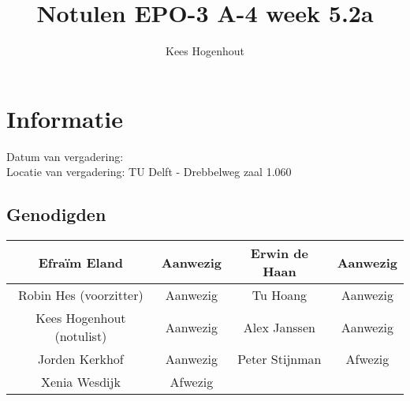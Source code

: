 \documentclass{article}
\begin{document}
\title{Notulen EPO-3 A-4 week 5.2a }%
\author{Kees Hogenhout}%
\maketitle

\section*{Informatie}
Datum van vergadering: \\ %
Locatie van vergadering: TU Delft - Drebbelweg zaal 1.060 %
\subsection*{Genodigden}
\begin{center}
\begin{tabular}{|c |c | c| c|}
	\hline
Efraïm Eland  & Aanwezig & Erwin de Haan & Aanwezig \\
	\hline
Robin Hes (voorzitter) & Aanwezig & Tu Hoang & Aanwezig \\
	\hline
Kees Hogenhout (notulist) & Aanwezig & Alex Janssen & Aanwezig\\
	\hline
Jorden Kerkhof & Aanwezig & Peter Stijnman & Afwezig \\
	\hline
Xenia Wesdijk & Afwezig & & \\
	\hline
\end{tabular}
\end{center}
\end{document}
